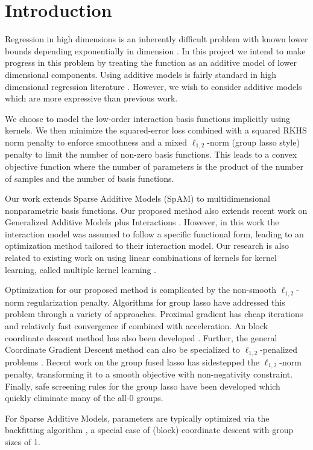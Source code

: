 

\section{Introduction}

Regression in high dimensions is an inherently difficult problem with known
lower bounds depending exponentially in dimension
\citep{gyorfi02distributionfree}. In this
project we intend to make progress in this problem by treating the function as
an additive model of lower dimensional components.
Using additive models is fairly standard in high dimensional regression
literature \cite{hastie90gam,ravikumar09spam,lafferty05rodeo}. 
However, we wish to consider additive models which are more expressive than
previous work.

We choose to model the low-order interaction basis functions implicitly using kernels.
We then minimize the squared-error loss combined with 
a squared RKHS norm penalty to enforce smoothness
and a mixed $\ell_{1,2}$-norm (group lasso style) penalty 
to limit the number of non-zero basis functions.
This leads to a convex objective function where the number of parameters is
the product of the number of samples and the number of basis functions.

Our work extends Sparse Additive Models (SpAM) \citep{ravikumar09spam} 
to multidimensional nonparametric basis functions.
Our proposed method also extends recent work on 
Generalized Additive Models plus Interactions \citep{intelligible:2013}.
However, in this work the interaction model was assumed to follow a specific functional form,
leading to an optimization method tailored to their interaction model.
Our research is also related to existing work on 
using linear combinations of kernels for kernel learning,
called multiple kernel learning \citep{mkl-review:2011}.

Optimization for our proposed method is complicated by 
the non-smooth $\ell_{1,2}$-norm regularization penalty.
Algorithms for group lasso have addressed this problem 
through a variety of approaches.
Proximal gradient \citep{beck2009fast}
has cheap iterations and relatively fast convergence if combined with acceleration.
An block coordinate descent method has also been developed \citep{bcd-group-lasso:2013}.
Further, the general Coordinate Gradient Descent method \citep{cgd:2009} 
can also be specialized to $\ell_{1,2}$-penalized problems 
\citep{meier2008group,note-group-lasso:2010}.
Recent work \citep{group-fused-lasso:2014} on the group fused lasso 
has sidestepped the $\ell_{1,2}$-norm penalty, transforming it to a 
smooth objective with non-negativity constraint.
Finally, safe screening rules for the group lasso have been developed 
\citep{group-lasso-screening:2013} which quickly eliminate many of the all-0 
groups.

For Sparse Additive Models, parameters are typically 
optimized via the backfitting algorithm \citep{ravikumar09spam}, 
a special case of (block) coordinate descent with group sizes of 1.

